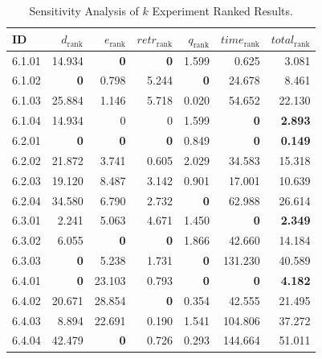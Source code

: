 \begin{table}[ht]
\centering
\footnotesize
\caption{Sensitivity Analysis of $k$ Experiment Ranked Results.}
\label{tab:k_sensitivity_ranked}
\begin{tabular}{@{}lrrrrrr@{}}
\hline
    ID & $d_{\text{rank}}$ & $e_{\text{rank}}$ & $retr_{\text{rank}}$ & $q_{\text{rank}}$ & $time_{\text{rank}}$ & $total_{\text{rank}}$ \\
\hline
    6.1.01 & 14.934 & \textbf{0} & \textbf{0} & 1.599 & 0.625 & 3.081 \\
    6.1.02 & \textbf{0} & 0.798 & 5.244 & \textbf{0} & 24.678 & 8.461 \\
    6.1.03 & 25.884 & 1.146 & 5.718 & 0.020 & 54.652 & 22.130 \\
    6.1.04 & 14.934 & 0 & 0 & 1.599 & \textbf{0} & \textbf{2.893} \\
    \noalign{\smallskip}
    6.2.01 & \textbf{0} & \textbf{0} & \textbf{0} & 0.849 & \textbf{0} & \textbf{0.149} \\
    6.2.02 & 21.872 & 3.741 & 0.605 & 2.029 & 34.583 & 15.318 \\
    6.2.03 & 19.120 & 8.487 & 3.142 & 0.901 & 17.001 & 10.639 \\
    6.2.04 & 34.580 & 6.790 & 2.732 & \textbf{0} & 62.988 & 26.614 \\
    \noalign{\smallskip}
    6.3.01 & 2.241 & 5.063 & 4.671 & 1.450 & \textbf{0} & \textbf{2.349} \\
    6.3.02 & 6.055 & \textbf{0} & \textbf{0} & 1.866 & 42.660 & 14.184 \\
    6.3.03 & \textbf{0} & 5.238 & 1.731 & \textbf{0} & 131.230 & 40.589 \\
    \noalign{\smallskip}
    6.4.01 & \textbf{0} & 23.103 & 0.793 & \textbf{0} & \textbf{0} & \textbf{4.182} \\
    6.4.02 & 20.671 & 28.854 & \textbf{0} & 0.354 & 42.555 & 21.495 \\
    6.4.03 & 8.894 & 22.691 & 0.190 & 1.541 & 104.806 & 37.272 \\
    6.4.04 & 42.479 & \textbf{0} & 0.726 & 0.293 & 144.664 & 51.011 \\
\hline
\end{tabular}
\end{table}